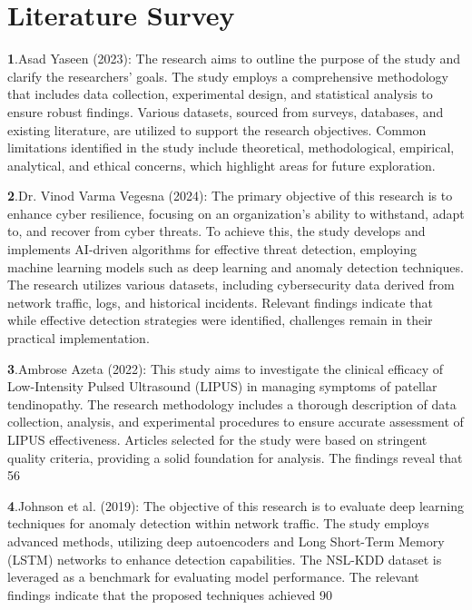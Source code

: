 \documentclass[oneside,a4paper,12pt]{report}
\begin{document}
\newpage
\chapter{Literature Survey}

\textbf1.Asad Yaseen (2023):
The research aims to outline the purpose of the study and clarify the researchers' goals. The study employs a comprehensive methodology that includes data collection, experimental design, and statistical analysis to ensure robust findings. Various datasets, sourced from surveys, databases, and existing literature, are utilized to support the research objectives. Common limitations identified in the study include theoretical, methodological, empirical, analytical, and ethical concerns, which highlight areas for future exploration.\newline

\textbf 2.Dr. Vinod Varma Vegesna (2024):
The primary objective of this research is to enhance cyber resilience, focusing on an organization’s ability to withstand, adapt to, and recover from cyber threats. To achieve this, the study develops and implements AI-driven algorithms for effective threat detection, employing machine learning models such as deep learning and anomaly detection techniques. The research utilizes various datasets, including cybersecurity data derived from network traffic, logs, and historical incidents. Relevant findings indicate that while effective detection strategies were identified, challenges remain in their practical implementation.\newline

\textbf3.Ambrose Azeta (2022):
This study aims to investigate the clinical efficacy of Low-Intensity Pulsed Ultrasound (LIPUS) in managing symptoms of patellar tendinopathy. The research methodology includes a thorough description of data collection, analysis, and experimental procedures to ensure accurate assessment of LIPUS effectiveness. Articles selected for the study were based on stringent quality criteria, providing a solid foundation for analysis. The findings reveal that 56%

\textbf 4.Johnson et al. (2019):
The objective of this research is to evaluate deep learning techniques for anomaly detection within network traffic. The study employs advanced methods, utilizing deep autoencoders and Long Short-Term Memory (LSTM) networks to enhance detection capabilities. The NSL-KDD dataset is leveraged as a benchmark for evaluating model performance. The relevant findings indicate that the proposed techniques achieved 90%
\end{document}
